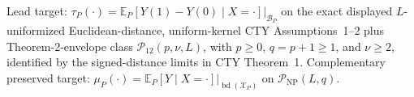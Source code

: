 Lead target: \(\tau_P(\cdot)=\mathbb E_P[Y(1)-Y(0)\mid X=\cdot]\big|_{\mathcal B_P}\) on the exact displayed \(L\)-uniformized Euclidean-distance, uniform-kernel CTY Assumptions~1--2 plus Theorem-2-envelope class \(\mathcal P_{12}(p,\nu,L)\), with \(p\geq0\), \(q=p+1\geq1\), and \(\nu\geq2\), identified by the signed-distance limits in CTY Theorem~1.  Complementary preserved target: \(\mu_P(\cdot)=\mathbb E_P[Y\mid X=\cdot]\big|_{\operatorname{bd}(\mathcal X_P)}\) on \(\mathcal P_{\mathrm{NP}}(L,q)\).
